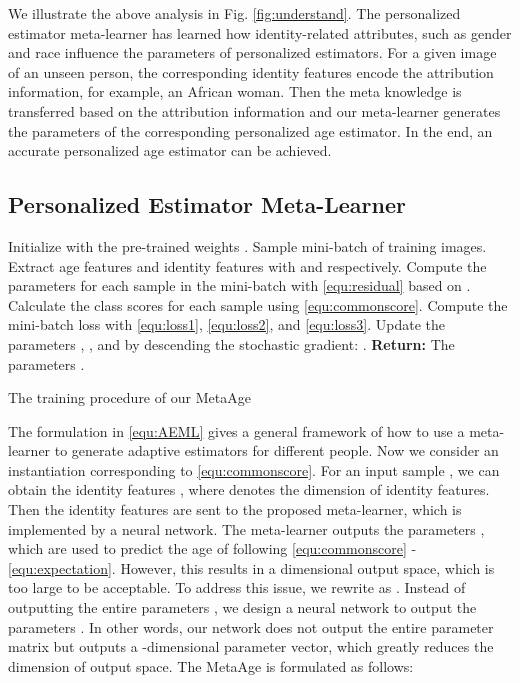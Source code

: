 \documentclass[journal,twoside]{IEEEtran}
\begin{document}
We illustrate the above analysis in Fig. \ref{fig:understand}. The personalized estimator meta-learner has learned how identity-related attributes, such as gender and race influence the parameters of personalized estimators. For a given image of an unseen person, the corresponding identity features encode the attribution information, for example, an African woman. Then the meta knowledge is transferred based on the attribution information and our meta-learner generates the parameters of the corresponding personalized age estimator. In the end, an accurate personalized age estimator can be achieved.






\subsection{Personalized Estimator Meta-Learner}

\begin{algorithm}[t]
	\DontPrintSemicolon
	\SetAlgoLined	
    Initialize  with the pre-trained weights .\;
    \For{ }
     {
      Sample mini-batch of  training images.\;
      Extract age features and identity features with  and  respectively.\;
      Compute the parameters  for each sample  in the mini-batch with \eqref{equ:residual} based on .\;
      Calculate the class scores for each sample using \eqref{equ:commonscore}.\;
      Compute the mini-batch loss  with \eqref{equ:loss1}, \eqref{equ:loss2}, and \eqref{equ:loss3}.\;
      Update the parameters , , and  by descending the stochastic gradient: .\;
     }
\textbf{Return:} The parameters .
\caption{ The training procedure of our MetaAge} \label{alg:pattrain}	
\end{algorithm}

The formulation in \eqref{equ:AEML} gives a general framework of how to use a meta-learner  to generate adaptive estimators for different people. Now we consider an instantiation corresponding to \eqref{equ:commonscore}. For an input sample , we can obtain the identity features , where  denotes the dimension of identity features. Then the identity features  are sent to the proposed meta-learner, which is implemented by a neural network. The meta-learner outputs the parameters , which are used to predict the age of  following \eqref{equ:commonscore} - \eqref{equ:expectation}. However, this results in a  dimensional output space, which is too large to be acceptable.
To address this issue, we rewrite  as . Instead of outputting the entire parameters , we design a neural network  to output the parameters . In other words, our network does not output the entire parameter matrix  but outputs a -dimensional parameter vector, which greatly reduces the dimension of output space. The MetaAge is formulated as follows:
\end{document}
